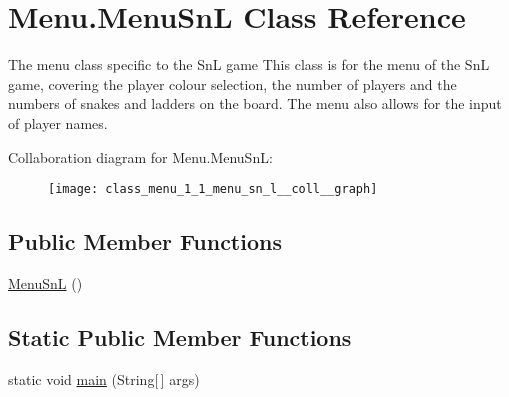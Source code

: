 \hypertarget{class_menu_1_1_menu_sn_l}{}\section{Menu.\+Menu\+Sn\+L Class Reference}
\label{class_menu_1_1_menu_sn_l}


The menu class specific to the Sn\+L game This class is for the menu of the Sn\+L game, covering the player colour selection, the number of players and the numbers of snakes and ladders on the board. The menu also allows for the input of player names.  




Collaboration diagram for Menu.\+Menu\+Sn\+L\+:
\nopagebreak
\begin{figure}[H]
\begin{center}
\leavevmode
\texttt{[image: class\_menu\_1\_1\_menu\_sn\_l\_\_coll\_\_graph]}
\end{center}
\end{figure}
\subsection*{Public Member Functions}
\begin{DoxyCompactItemize}
\item 
\hyperlink{class_menu_1_1_menu_sn_l_a39167b25cf1ab4be1f66b6a327635e7b}{Menu\+Sn\+L} ()
\end{DoxyCompactItemize}
\subsection*{Static Public Member Functions}
\begin{DoxyCompactItemize}
\item 
static void \hyperlink{class_menu_1_1_menu_sn_l_af94b678ab820b841c5d39e683a7e26c5}{main} (String\mbox{[}$\,$\mbox{]} args)
\end{DoxyCompactItemize}
